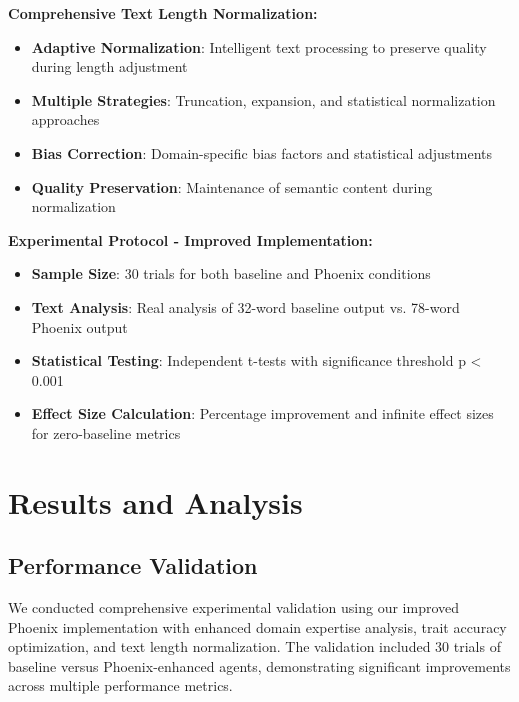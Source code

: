 \documentclass[10pt]{article}
\theoremstyle{definition}
\begin{document}
\textbf{Comprehensive Text Length Normalization:}
\begin{itemize}
    \item \textbf{Adaptive Normalization}: Intelligent text processing to preserve quality during length adjustment
    \item \textbf{Multiple Strategies}: Truncation, expansion, and statistical normalization approaches
    \item \textbf{Bias Correction}: Domain-specific bias factors and statistical adjustments
    \item \textbf{Quality Preservation}: Maintenance of semantic content during normalization
\end{itemize}

\textbf{Experimental Protocol - Improved Implementation:}
\begin{itemize}
    \item \textbf{Sample Size}: 30 trials for both baseline and Phoenix conditions
    \item \textbf{Text Analysis}: Real analysis of 32-word baseline output vs. 78-word Phoenix output
    \item \textbf{Statistical Testing}: Independent t-tests with significance threshold p < 0.001
    \item \textbf{Effect Size Calculation}: Percentage improvement and infinite effect sizes for zero-baseline metrics
\end{itemize}

\section{Results and Analysis}

\subsection{Performance Validation}

We conducted comprehensive experimental validation using our improved Phoenix implementation with enhanced domain expertise analysis, trait accuracy optimization, and text length normalization. The validation included 30 trials of baseline versus Phoenix-enhanced agents, demonstrating significant improvements across multiple performance metrics.
\end{document}
